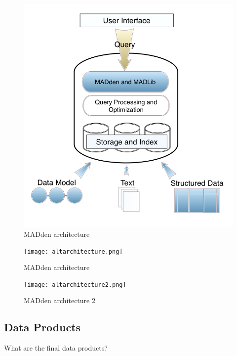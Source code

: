 \documentclass{article}
\newcommand{\system}{MADden\xspace}
\begin{document}
\begin{enumerate}
  \begin{figure}
    \begin{center}
      \includegraphics[scale=0.4]{arch.png}
      \caption{{\system} architecture}
      \label{fig:arch}
    \end{center}
  \end{figure}


  \begin{figure}
    \begin{center}
      \texttt{[image: altarchitecture.png]}
      \caption{{\system} architecture}
      \label{fig:altarch}
    \end{center}
  \end{figure}


  \begin{figure}
    \begin{center}
      \texttt{[image: altarchitecture2.png]}
      \caption{{\system} architecture 2}
      \label{fig:altarch2}
    \end{center}
  \end{figure}



  \subsection{Data Products}
  What are the final data products?


\end{enumerate}
\end{document}
